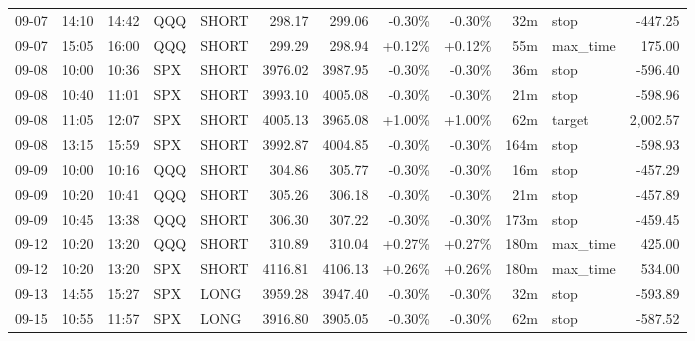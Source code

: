 \documentclass[11pt,a4paper,twoside]{article}
\begin{document}
\begin{center}
\begin{longtable}{>{\color{txtmain}}l l l l l r r r r r >{\color{txtmain}}l r}
09-07 & 14:10 & 14:42 & QQQ & SHORT & 298.17 & 299.06 & \textcolor{lossred}{-0.30\%} & \textcolor{lossred}{-0.30\%} & 32m & stop & \textcolor{lossred}{-447.25} \\
09-07 & 15:05 & 16:00 & QQQ & SHORT & 299.29 & 298.94 & \textcolor{wingreen}{+0.12\%} & \textcolor{wingreen}{+0.12\%} & 55m & max\_time & \textcolor{wingreen}{175.00} \\
09-08 & 10:00 & 10:36 & SPX & SHORT & 3976.02 & 3987.95 & \textcolor{lossred}{-0.30\%} & \textcolor{lossred}{-0.30\%} & 36m & stop & \textcolor{lossred}{-596.40} \\
09-08 & 10:40 & 11:01 & SPX & SHORT & 3993.10 & 4005.08 & \textcolor{lossred}{-0.30\%} & \textcolor{lossred}{-0.30\%} & 21m & stop & \textcolor{lossred}{-598.96} \\
09-08 & 11:05 & 12:07 & SPX & SHORT & 4005.13 & 3965.08 & \textcolor{wingreen}{+1.00\%} & \textcolor{wingreen}{+1.00\%} & 62m & target & \textcolor{wingreen}{2,002.57} \\
09-08 & 13:15 & 15:59 & SPX & SHORT & 3992.87 & 4004.85 & \textcolor{lossred}{-0.30\%} & \textcolor{lossred}{-0.30\%} & 164m & stop & \textcolor{lossred}{-598.93} \\
09-09 & 10:00 & 10:16 & QQQ & SHORT & 304.86 & 305.77 & \textcolor{lossred}{-0.30\%} & \textcolor{lossred}{-0.30\%} & 16m & stop & \textcolor{lossred}{-457.29} \\
09-09 & 10:20 & 10:41 & QQQ & SHORT & 305.26 & 306.18 & \textcolor{lossred}{-0.30\%} & \textcolor{lossred}{-0.30\%} & 21m & stop & \textcolor{lossred}{-457.89} \\
09-09 & 10:45 & 13:38 & QQQ & SHORT & 306.30 & 307.22 & \textcolor{lossred}{-0.30\%} & \textcolor{lossred}{-0.30\%} & 173m & stop & \textcolor{lossred}{-459.45} \\
09-12 & 10:20 & 13:20 & QQQ & SHORT & 310.89 & 310.04 & \textcolor{wingreen}{+0.27\%} & \textcolor{wingreen}{+0.27\%} & 180m & max\_time & \textcolor{wingreen}{425.00} \\
09-12 & 10:20 & 13:20 & SPX & SHORT & 4116.81 & 4106.13 & \textcolor{wingreen}{+0.26\%} & \textcolor{wingreen}{+0.26\%} & 180m & max\_time & \textcolor{wingreen}{534.00} \\
09-13 & 14:55 & 15:27 & SPX & LONG & 3959.28 & 3947.40 & \textcolor{lossred}{-0.30\%} & \textcolor{lossred}{-0.30\%} & 32m & stop & \textcolor{lossred}{-593.89} \\
09-15 & 10:55 & 11:57 & SPX & LONG & 3916.80 & 3905.05 & \textcolor{lossred}{-0.30\%} & \textcolor{lossred}{-0.30\%} & 62m & stop & \textcolor{lossred}{-587.52} \\

\end{longtable}
\end{center}
\end{document}
